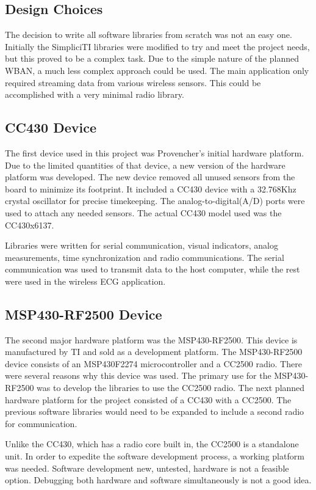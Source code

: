 \documentclass{article}
\begin{document}
\subsection{Design Choices}
The decision to write all software libraries from scratch was not an easy one. Initially the SimpliciTI libraries were modified to try and meet the project needs, but this proved to be a complex task. Due to the simple nature of the planned WBAN, a much less complex approach could be used. The main application only required streaming data from various wireless sensors. This could be accomplished with a very minimal radio library.

\subsection{CC430 Device}
The first device used in this project was Provencher's initial hardware platform. Due to the limited quantities of that device, a new version of the hardware platform was developed. The new device removed all unused sensors from the board to minimize its footprint. It included a CC430 device with a 32.768Khz crystal oscillator for precise timekeeping. The analog-to-digital(A/D) ports were used to attach any needed sensors. The actual CC430 model used was the CC430x6137.

Libraries were written for serial communication, visual indicators, analog measurements, time synchronization and radio communications. The serial communication was used to transmit data to the host computer, while the rest were used in the wireless ECG application.

\subsection{MSP430-RF2500 Device}
The second major hardware platform was the MSP430-RF2500. This device is manufactured by TI and sold as a development platform. The MSP430-RF2500 device consists of an MSP430F2274 microcontroller and a CC2500 radio. There were several reasons why this device was used. The primary use for the MSP430-RF2500 was to develop the libraries to use the CC2500 radio. The next planned hardware platform for the project consisted of a CC430 with a CC2500. The previous software libraries would need to be expanded to include a second radio for communication.

Unlike the CC430, which has a radio core built in, the CC2500 is a standalone unit. In order to expedite the software development process, a working platform was needed. Software development new, untested, hardware is not a feasible option. Debugging both hardware and software simultaneously is not a good idea.
\end{document}
